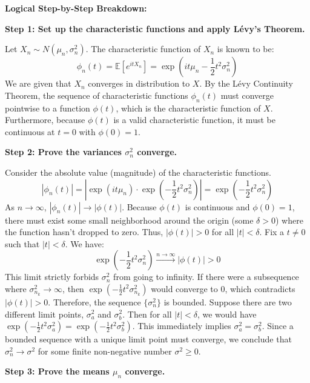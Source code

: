 \begin{solution}
\textbf{Logical Step-by-Step Breakdown:}

\textbf{Step 1: Set up the characteristic functions and apply Lévy's Theorem.}

Let $X_n \sim N(\mu_n, \sigma_n^2)$. The characteristic function of $X_n$ is known to be:
\[ \phi_n(t) = \mathbb{E}[e^{itX_n}] = \exp\left(it\mu_n - \frac{1}{2}t^2\sigma_n^2\right) \]
We are given that $X_n$ converges in distribution to $X$.
By the Lévy Continuity Theorem, the sequence of characteristic functions $\phi_n(t)$ must converge pointwise to a function $\phi(t)$, which is the characteristic function of $X$.
Furthermore, because $\phi(t)$ is a valid characteristic function, it must be continuous at $t=0$ with $\phi(0) = 1$.

\textbf{Step 2: Prove the variances $\sigma_n^2$ converge.}

Consider the absolute value (magnitude) of the characteristic functions.
\[ |\phi_n(t)| = \left| \exp(it\mu_n) \cdot \exp\left(-\frac{1}{2}t^2\sigma_n^2\right) \right| = \exp\left(-\frac{1}{2}t^2\sigma_n^2\right) \]
As $n \to \infty$, $|\phi_n(t)| \to |\phi(t)|$.
Because $\phi(t)$ is continuous and $\phi(0)=1$, there must exist some small neighborhood around the origin (some $\delta > 0$) where the function hasn't dropped to zero. Thus, $|\phi(t)| > 0$ for all $|t| < \delta$.
Fix a $t \neq 0$ such that $|t| < \delta$. We have:
\[ \exp\left(-\frac{1}{2}t^2\sigma_n^2\right) \xrightarrow{n \to \infty} |\phi(t)| > 0 \]
This limit strictly forbids $\sigma_n^2$ from going to infinity. If there were a subsequence where $\sigma_{n_k}^2 \to \infty$, then $\exp(-\frac{1}{2}t^2\sigma_{n_k}^2)$ would converge to 0, which contradicts $|\phi(t)| > 0$. Therefore, the sequence $\{\sigma_n^2\}$ is bounded.
Suppose there are two different limit points, $\sigma_a^2$ and $\sigma_b^2$. Then for all $|t| < \delta$, we would have $\exp(-\frac{1}{2}t^2\sigma_a^2) = \exp(-\frac{1}{2}t^2\sigma_b^2)$. This immediately implies $\sigma_a^2 = \sigma_b^2$.
Since a bounded sequence with a unique limit point must converge, we conclude that $\sigma_n^2 \to \sigma^2$ for some finite non-negative number $\sigma^2 \geq 0$.

\textbf{Step 3: Prove the means $\mu_n$ converge.}


\end{solution}
